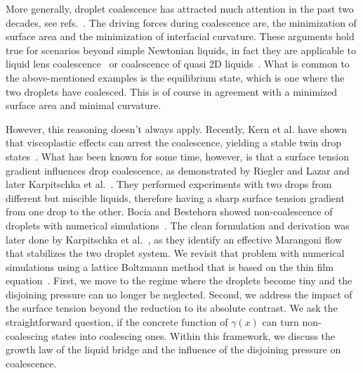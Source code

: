 \documentclass[twocolumn,amsmath,amssymb,showpacs,nofootinbib,prfluids,superscriptaddress]{revtex4-2} %
\begin{document}
More generally, droplet coalescence has attracted much attention in the past two decades, see refs.~\cite{eggers_lister_stone_1999, duchemin_eggers_josserand_2003, PhysRevLett.95.164503, PhysRevLett.106.114501, doi:10.1063/1.4828721}. 
The driving forces during coalescence are, the minimization of surface area and the minimization of interfacial curvature. 
These arguments hold true for scenarios beyond simple Newtonian liquids, in fact they are applicable to liquid lens coalescence~\cite{PhysRevLett.124.194502} or coalescence of quasi 2D liquids~\cite{klopp2020self, doi:10.1021/acs.langmuir.0c02139}.
What is common to the above-mentioned examples is the equilibrium state, which is one where the two droplets have coalesced.
This is of course in agreement with a minimized surface area and minimal curvature.

However, this reasoning doesn't always apply. 
Recently, Kern et al. have shown that viscoplastic effects can arrest the coalescence, yielding a stable twin drop states~\cite{PhysRevFluids.7.L081601}.
What has been known for some time, however, is that a surface tension gradient influences drop coalescence, as demonstrated by Riegler and Lazar and later Karpitschka et al.~\cite{PhysRevLett.109.066103, doi:10.1021/la500459v, karpitschka2014sharp, bruning2018delayed}.
They performed experiments with two drops from different but miscible liquids, therefore having a sharp surface tension gradient from one drop to the other.
Bocia and Bestehorn showed non-coalescence of droplets with numerical simulations~\cite{PhysRevE.82.036312, borcia2011coalescence}.
The clean formulation and derivation was later done by Karpitschka et al.~\cite{PhysRevLett.109.066103}, as they identify an effective Marangoni flow that stabilizes the two droplet system.
We revisit that problem with numerical simulations using a lattice Boltzmann method that is based on the thin film equation~\cite{PhysRevE.100.033313}.
First, we move to the regime where the droplets become tiny and the disjoining pressure can no longer be neglected.
Second, we address the impact of the surface tension beyond the reduction to its absolute contrast.
We ask the straightforward question, if the concrete function of $\gamma(x)$ can turn non-coalescing states into coalescing ones.
Within this framework, we discuss the growth law of the liquid bridge and the influence of the disjoining pressure on coalescence.
\end{document}
